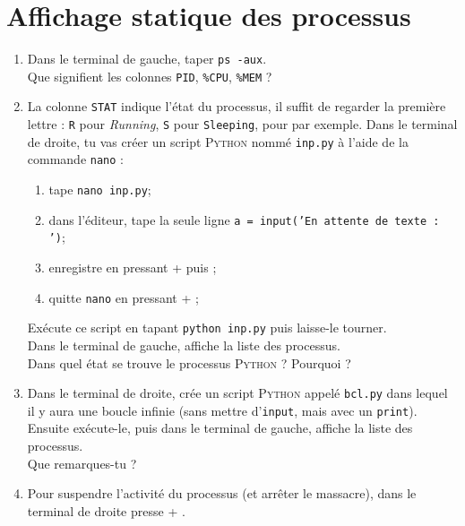 \documentclass[a4paper,12pt,french]{book}
\begin{document}
\section*{Affichage statique des processus}
\begin{enumerate}
    \item Dans le terminal de gauche, taper \texttt{ps -aux}.\\
    Que signifient les colonnes \texttt{PID}, \texttt{\%CPU}, \texttt{\%MEM} ?\\

    \item La colonne \texttt{STAT} indique l'état du processus, il suffit de regarder la première lettre : \texttt{R} pour \textit{Running}, \texttt{S} pour \texttt{Sleeping},  pour  par exemple.
        Dans le terminal de droite, tu vas créer un script \textsc{Python} nommé \texttt{inp.py} à l'aide de la commande \texttt{nano} :
        \begin{enumerate}[--]
        	\item tape \texttt{nano inp.py};
            \item dans l'éditeur, tape la seule ligne \texttt{a = input('En attente de texte : ')};
            \item enregistre en pressant  +  puis ;
            \item quitte \texttt{nano} en pressant  + ;\\
        \end{enumerate}
        Exécute ce script en tapant \texttt{python inp.py} puis laisse-le tourner.\\
        Dans le terminal de gauche, affiche la liste des processus.\\
        Dans quel état se trouve le processus \textsc{Python} ? Pourquoi ?\\

    \item Dans le terminal de droite, crée un script \textsc{Python} appelé \texttt{bcl.py} dans lequel il y aura une boucle infinie (sans mettre d'\texttt{input}, mais avec un \texttt{print}).\\
        Ensuite exécute-le, puis dans le terminal de gauche, affiche la liste des processus.\\
        Que remarques-tu ?\\

    \item Pour suspendre l'activité du processus (et arrêter le massacre), dans le terminal de droite presse  + .\\


\end{enumerate}
\end{document}
